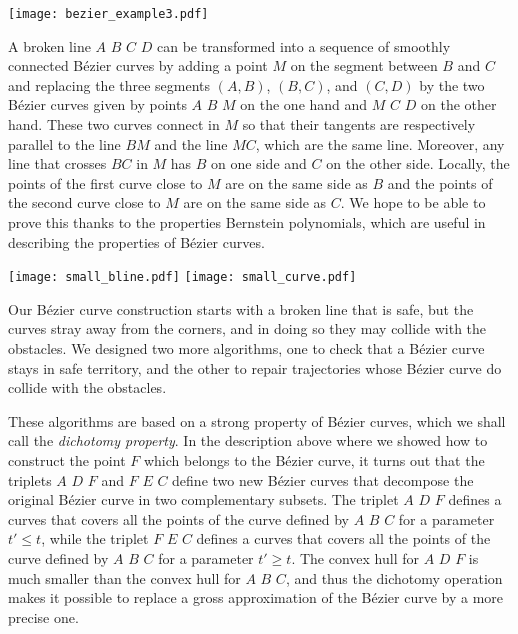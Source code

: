 \documentclass{easychair}
\begin{document}
\begin{center}
\texttt{[image: bezier\_example3.pdf]}
\end{center}

A broken line \(A\) \(B\) \(C\) \(D\) can be transformed into a sequence
of smoothly connected Bézier
curves by adding a point \(M\) on the segment between \(B\) and \(C\)
and replacing the three segments \((A, B)\), \((B, C)\), and \((C,
D)\) by the two Bézier curves given by points \(A\) \(B\) \(M\) on the
one hand and \(M\) \(C\) \(D\) on the other hand.  These two curves
connect in \(M\) so that their tangents are respectively parallel to
the line \(BM\) and the line \(MC\), which are the same line.  Moreover,
any line that crosses \(BC\) in \(M\) has \(B\) on one side and \(C\) on the
other side.  Locally, the points of the first curve close to \(M\) are on the
same side as \(B\) and the points of the second curve close to \(M\) are on
the same side as \(C\).  We hope to be able to prove this thanks to the
properties Bernstein polynomials, which are useful in describing the properties
of Bézier curves.

\begin{center}
\texttt{[image: small\_bline.pdf]}
\texttt{[image: small\_curve.pdf]}
\end{center}

Our Bézier curve construction starts with a broken line that is safe,
but the curves stray away from the corners, and in doing so they may
collide with the obstacles.  We designed two more algorithms, one to check
that a Bézier curve stays in safe territory, and the other to repair
trajectories whose Bézier curve do collide with the obstacles.

These algorithms are based on a strong property of Bézier curves,
which we shall call the {\em dichotomy property}.  In the description above
where we showed how to construct the point \(F\) which belongs to
the Bézier curve, it turns out that the triplets \(A\) \(D\) \(F\) and
\(F\) \(E\) \(C\) define two new Bézier curves that decompose the
original Bézier curve in two complementary subsets.  The triplet
\(A\) \(D\) \(F\) defines a curves that
covers all the points of the curve defined by \(A\) \(B\) \(C\)
for a parameter \(t' \leq t\), while the triplet \(F\) \(E\) \(C\) 
defines a curves that covers all the points of the curve defined by \(A\) \(B\)
\(C\) for a parameter \(t'\geq t\).  The convex hull for \(A\) \(D\)
\(F\) is much smaller than the convex hull for \(A\) \(B\) \(C\), and
thus the dichotomy operation makes it possible to replace a gross
approximation of the Bézier curve by a more precise one.
\end{document}
